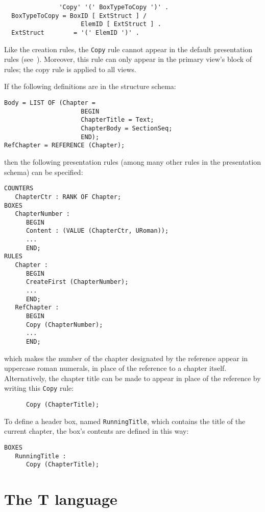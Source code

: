 \begin{verbatim}
               'Copy' '(' BoxTypeToCopy ')' .
  BoxTypeToCopy = BoxID [ ExtStruct ] /
                     ElemID [ ExtStruct ] .
  ExtStruct        = '(' ElemID ')' .
\end{verbatim}

Like the creation rules, the {\tt Copy} rule cannot appear in the
default presentation rules (see~\pageref{reglesdefaut}).  Moreover,
this rule can only appear in the primary view's block of rules; the
copy rule is applied to all views.

\begin{example}
If the following definitions are in the structure schema:

\begin{verbatim}
Body = LIST OF (Chapter =
                     BEGIN
                     ChapterTitle = Text;
                     ChapterBody = SectionSeq;
                     END);
RefChapter = REFERENCE (Chapter);
\end{verbatim}
then the following presentation rules (among many other rules in the
presentation schema) can be specified:

\begin{verbatim}
COUNTERS
   ChapterCtr : RANK OF Chapter;
BOXES
   ChapterNumber :
      BEGIN
      Content : (VALUE (ChapterCtr, URoman));
      ...
      END;
RULES
   Chapter :
      BEGIN
      CreateFirst (ChapterNumber);
      ...
      END;
   RefChapter :
      BEGIN
      Copy (ChapterNumber);
      ...
      END;
\end{verbatim}
which makes the number of the chapter designated by the reference
appear in uppercase roman numerals, in place of the reference to a
chapter itself.  Alternatively, the chapter title can be made to
appear in place of the reference by writing this {\tt Copy} rule:

\begin{verbatim}
      Copy (ChapterTitle);
\end{verbatim}

To define a header box, named {\tt RunningTitle}, which contains the
title of the current chapter, the box's contents are defined in this way:
\begin{verbatim}
BOXES
   RunningTitle :
      Copy (ChapterTitle);
\end{verbatim}

\end{example}

\chapter{The T language}

